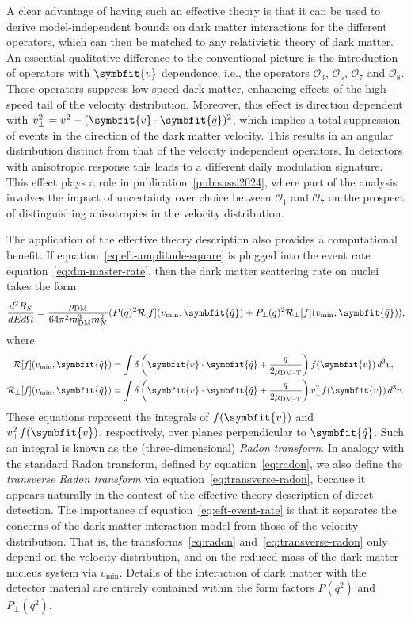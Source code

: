 \documentclass[b5paper, 10pt, twoside]{book}
\renewcommand{\vec}[1]{\symbfit{#1}}
\newcommand{\ddder}[3]{\frac{d^2#1}{d#2d#3}}
\newcommand{\unitv}[1]{\symbfit{\hat{#1}}}
\newcommand{\difd}{\,d}
\begin{document}
A clear advantage of having such an effective theory is that it can be used to derive model-independent bounds on dark matter interactions for the different operators, which can then be matched to any relativistic theory of dark matter. An essential qualitative difference to the conventional picture is the introduction of operators with $\vec{v}$ dependence, i.e., the operators $\mathcal{O}_3$, $\mathcal{O}_5$, $\mathcal{O}_7$ and $\mathcal{O}_8$. These operators suppress low-speed dark matter, enhancing effects of the high-speed tail of the velocity distribution. Moreover, this effect is direction dependent with $v_\perp^2=v^2-(\vec{v}\cdot\unitv{q})^2$, which implies a total suppression of events in the direction of the dark matter velocity. This results in an angular distribution distinct from that of the velocity independent operators. In detectors with anisotropic response this leads to a different daily modulation signature. This effect plays a role in publication~\ref{pub:sassi2024}, where part of the analysis involves the impact of uncertainty over choice between $\mathcal{O}_1$ and $\mathcal{O}_7$ on the prospect of distinguishing anisotropies in the velocity distribution.

The application of the effective theory description also provides a computational benefit. If equation~\eqref{eq:eft-amplitude-square} is plugged into the event rate equation~\eqref{eq:dm-master-rate}, then the dark matter scattering rate on nuclei takes the form
\begin{equation}
    \ddder{R_S}{E}{\Omega}=\frac{\rho_\text{DM}}{64\pi^2m_\text{DM}^3m_N^2}(P(q)^2\mathcal{R}[f](v_\text{min},\unitv{q})+P_\perp(q)^2\mathcal{R}_\perp[f](v_\text{min},\unitv{q})),
    \label{eq:eft-event-rate}
\end{equation}
where
\begin{align}
    \label{eq:radon}
    \mathcal{R}[f](v_\text{min},\unitv{q})&=\int\delta\left(\vec{v}\cdot\unitv{q}+\frac{q}{2\mu_\text{DM--T}}\right)f(\vec{v})\difd^3v,\\
    \label{eq:transverse-radon}
    \mathcal{R}_\perp[f](v_\text{min},\unitv{q})&=\int\delta\left(\vec{v}\cdot\unitv{q}+\frac{q}{2\mu_\text{DM--T}}\right)v_\perp^2f(\vec{v})\difd^3v.
\end{align}
These equations represent the integrals of $f(\vec{v})$ and $v_\perp^2f(\vec{v})$, respectively, over planes perpendicular to $\unitv{q}$. Such an integral is known as the (three-dimensional) \emph{Radon transform}. In analogy with the standard Radon transform, defined by equation~\eqref{eq:radon}, we also define the \emph{transverse Radon transform} via equation~\eqref{eq:transverse-radon}, because it appears naturally in the context of the effective theory description of direct detection. The importance of equation~\eqref{eq:eft-event-rate} is that it separates the concerns of the dark matter interaction model from those of the velocity distribution. That is, the transforms~\eqref{eq:radon} and~\eqref{eq:transverse-radon} only depend on the velocity distribution, and on the reduced mass of the dark matter--nucleus system via $v_\text{min}$. Details of the interaction of dark matter with the detector material are entirely contained within the form factors $P(q^2)$ and $P_\perp(q^2)$.
\end{document}
